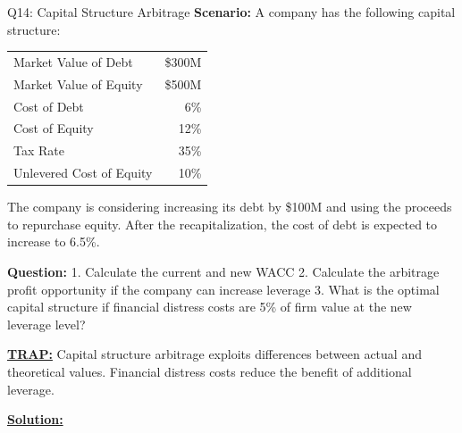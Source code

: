 \documentclass{beamer}
\renewcommand{\scriptsize}{\fontsize{6pt}{7pt}\selectfont}
\begin{document}
	\begin{frame}{Q14: Capital Structure Arbitrage}
		\scriptsize
		\textbf{Scenario:} A company has the following capital structure:
		
		\begin{tabular}{lr}
			Market Value of Debt & \$300M \\
			Market Value of Equity & \$500M \\
			Cost of Debt & 6\% \\
			Cost of Equity & 12\% \\
			Tax Rate & 35\% \\
			Unlevered Cost of Equity & 10\% \\
		\end{tabular}
		
		The company is considering increasing its debt by \$100M and using the proceeds to repurchase equity. After the recapitalization, the cost of debt is expected to increase to 6.5\%.
		
		\textbf{Question:}
		1. Calculate the current and new WACC
		2. Calculate the arbitrage profit opportunity if the company can increase leverage
		3. What is the optimal capital structure if financial distress costs are 5\% of firm value at the new leverage level?
		
		\vspace{2pt}
		\underline{\textbf{TRAP:}} Capital structure arbitrage exploits differences between actual and theoretical values. Financial distress costs reduce the benefit of additional leverage.
		
		\vspace{4pt}
		\underline{\textbf{Solution:}}
	\end{frame}
	
\end{document}
